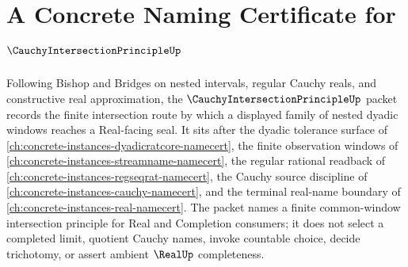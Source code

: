 \chapter{A Concrete Naming Certificate for $\CauchyIntersectionPrincipleUp$}
\label{ch:concrete-instances-cauchy-intersection-principle-namecert}

Following Bishop and Bridges on nested intervals, regular Cauchy reals, and constructive real approximation, the $\CauchyIntersectionPrincipleUp$ packet records the finite intersection route by which a displayed family of nested dyadic windows reaches a Real-facing seal. It sits after the dyadic tolerance surface of \autoref{ch:concrete-instances-dyadicratcore-namecert}, the finite observation windows of \autoref{ch:concrete-instances-streamname-namecert}, the regular rational readback of \autoref{ch:concrete-instances-regseqrat-namecert}, the Cauchy source discipline of \autoref{ch:concrete-instances-cauchy-namecert}, and the terminal real-name boundary of \autoref{ch:concrete-instances-real-namecert}. The packet names a finite common-window intersection principle for Real and Completion consumers; it does not select a completed limit, quotient Cauchy names, invoke countable choice, decide trichotomy, or assert ambient $\RealUp$ completeness.

